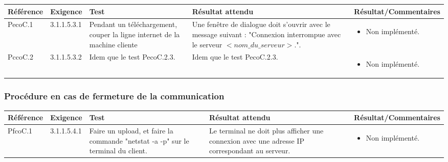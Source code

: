 \documentclass[10pt,a4paper,landscape]{report}
\begin{document}
\begin{center}
	\bgroup
	\def\arraystretch{1.5}
	\begin{tabular}{|p{2.5cm}|p{2cm}|p{8cm}|p{8cm}|p{5cm}|}
		\hline
		\rowcolor{gris}Référence & Exigence & Test & Résultat attendu & Résultat/Commentaires\\
		\hline
		PecoC.1 & 3.1.1.5.3.1 & Pendant un téléchargement, couper la ligne internet de la machine cliente & Une fenêtre de dialogue doit s'ouvrir avec le message suivant :   "Connexion interrompue avec le serveur $< nom\_du\_serveur>$.".&\vspace*{-0.2cm} \begin{itemize}[label=$\ast$] \item \textcolor{false}{Non implémenté.}\end{itemize} \\
		\hline
		PccoC.2 & 3.1.1.5.3.2 & Idem que le test PecoC.2.3. & Idem que le test PecoC.2.3. & \vspace*{-0.2cm} \begin{itemize}[label=$\ast$] \item \textcolor{false}{Non implémenté.}\end{itemize}\\
		\hline
	\end{tabular}
	\egroup
\end{center}

\subsubsection{Procédure en cas de fermeture de la communication}

\begin{center}
	\bgroup
	\def\arraystretch{1.5}
	\begin{tabular}{|p{2.5cm}|p{2cm}|p{8cm}|p{8cm}|p{5cm}|}
		\hline
		\rowcolor{gris}Référence & Exigence & Test & Résultat attendu & Résultat/Commentaires\\
		\hline
		PfcoC.1 & 3.1.1.5.4.1 & Faire un upload, et faire la commande "netstat -a -p" sur le terminal du client. & Le terminal ne doit plus afficher une connexion avec une adresse IP correspondant au serveur.&\vspace*{-0.2cm} \begin{itemize}[label=$\ast$] \item \textcolor{false}{Non implémenté.} \end{itemize} \\
		\hline
	\end{tabular}
	\egroup
\end{center}
\end{document}
